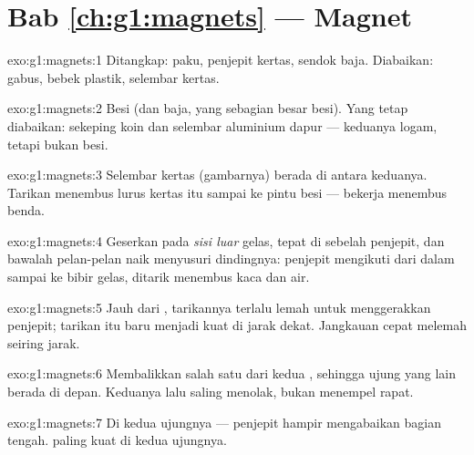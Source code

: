 \section*{Bab \ref{ch:g1:magnets} --- Magnet}

\begin{solution}{exo:g1:magnets:1}
Ditangkap: paku, penjepit kertas, sendok baja. Diabaikan: gabus, bebek
plastik, selembar kertas.
\end{solution}

\begin{solution}{exo:g1:magnets:2}
Besi (dan baja, yang sebagian besar besi). Yang tetap diabaikan:
sekeping koin dan selembar aluminium dapur --- keduanya logam, tetapi
bukan besi.
\end{solution}

\begin{solution}{exo:g1:magnets:3}
Selembar kertas (gambarnya) berada di antara keduanya. Tarikan 
menembus lurus kertas itu sampai ke pintu besi ---  bekerja
menembus benda.
\end{solution}

\begin{solution}{exo:g1:magnets:4}
Geserkan  pada \emph{sisi luar} gelas, tepat di sebelah
penjepit, dan bawalah pelan-pelan naik menyusuri dindingnya: penjepit
mengikuti dari dalam sampai ke bibir gelas, ditarik menembus kaca dan
air.
\end{solution}

\begin{solution}{exo:g1:magnets:5}
Jauh dari , tarikannya terlalu lemah untuk menggerakkan
penjepit; tarikan itu baru menjadi kuat di jarak dekat. Jangkauan
 cepat melemah seiring jarak.
\end{solution}

\begin{solution}{exo:g1:magnets:6}
Membalikkan salah satu dari kedua , sehingga ujung yang lain
berada di depan. Keduanya lalu saling menolak, bukan menempel rapat.
\end{solution}

\begin{solution}{exo:g1:magnets:7}
Di kedua ujungnya --- penjepit hampir mengabaikan bagian tengah.
 paling kuat di kedua ujungnya.
\end{solution}


